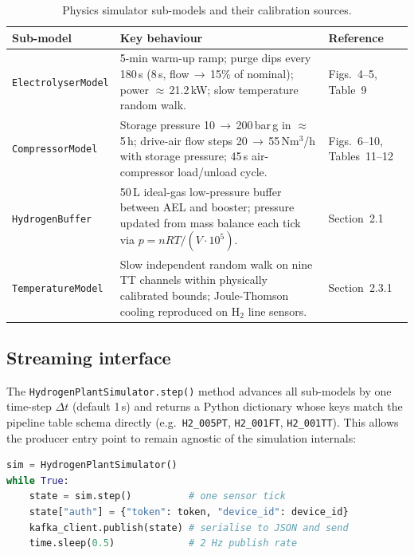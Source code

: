 \begin{table}[H]
  \centering
  \caption{Physics simulator sub-models and their calibration sources.}
  \label{tab:submodels}
  \begin{tabularx}{\textwidth}{lXl}
    \toprule
    \textbf{Sub-model} & \textbf{Key behaviour} & \textbf{Reference} \\
    \midrule
    \texttt{ElectrolyserModel}
      & 5-min warm-up ramp; purge dips every 180\,s (8\,s, flow\,$\to$\,15\%
        of nominal); power $\approx$\,21.2\,kW; slow temperature random walk.
      & Figs.~4--5, Table~9 \\[4pt]
    \texttt{CompressorModel}
      & Storage pressure 10\,$\to$\,200\,bar\,g in $\approx$\,5\,h;
        drive-air flow steps 20\,$\to$\,55\,Nm$^3$/h with storage pressure;
        45\,s air-compressor load/unload cycle.
      & Figs.~6--10, Tables~11--12 \\[4pt]
    \texttt{HydrogenBuffer}
      & 50\,L ideal-gas low-pressure buffer between AEL and booster;
        pressure updated from mass balance each tick via
        $p = nRT/(V \cdot 10^5)$.
      & Section~2.1 \\[4pt]
    \texttt{TemperatureModel}
      & Slow independent random walk on nine TT channels within
        physically calibrated bounds; Joule-Thomson cooling reproduced
        on H$_2$ line sensors.
      & Section~2.3.1 \\
    \bottomrule
  \end{tabularx}
\end{table}

\subsection{Streaming interface}
\label{subsec:sim-interface}

The \texttt{HydrogenPlantSimulator.step()} method advances all sub-models
by one time-step $\Delta t$ (default 1\,s) and returns a Python dictionary
whose keys match the pipeline table schema directly (e.g.\
\texttt{H2\_005PT}, \texttt{H2\_001FT}, \texttt{H2\_001TT}).
This allows the producer entry point to remain agnostic of the simulation
internals:

\begin{lstlisting}[language=Python, caption={Producer main loop (cmd/producer.py).},
                   label={lst:producer-loop}]
sim = HydrogenPlantSimulator()
while True:
    state = sim.step()          # one sensor tick
    state["auth"] = {"token": token, "device_id": device_id}
    kafka_client.publish(state) # serialise to JSON and send
    time.sleep(0.5)             # 2 Hz publish rate
\end{lstlisting}

